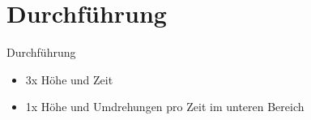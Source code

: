 \section{Durchführung}

\begin{frame}[t]{Durchführung}

    \begin{itemize}
    \item 3x Höhe und Zeit %
    \item 1x Höhe und Umdrehungen pro Zeit im unteren Bereich %
\end{itemize}

\end{frame}

